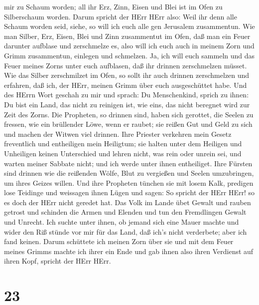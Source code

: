 mir zu Schaum worden; all ihr Erz, Zinn, Eisen und Blei ist im Ofen zu
Silberschaum worden.  Darum spricht der HErr HErr also:
Weil ihr denn alle Schaum worden seid, siehe, so will ich euch alle gen
Jerusalem zusammentun.  Wie man Silber, Erz, Eisen, Blei
und Zinn zusammentut im Ofen, daß man ein Feuer darunter aufblase und
zerschmelze es, also will ich euch auch in meinem Zorn und Grimm
zusammentun, einlegen und schmelzen.  Ja, ich will euch
sammeln und das Feuer meines Zorns unter euch aufblasen, daß ihr drinnen
zerschmelzen müsset.  Wie das Silber zerschmilzet im Ofen,
so sollt ihr auch drinnen zerschmelzen und erfahren, daß ich, der HErr,
meinen Grimm über euch ausgeschüttet habe.  Und des HErrn
Wort geschah zu mir und sprach:  Du Menschenkind, sprich zu
ihnen: Du bist ein Land, das nicht zu reinigen ist, wie eins, das nicht
beregnet wird zur Zeit des Zorns.  Die Propheten, so
drinnen sind, haben sich gerottet, die Seelen zu fressen, wie ein
brüllender Löwe, wenn er raubet; sie reißen Gut und Geld zu sich und
machen der Witwen viel drinnen.  Ihre Priester verkehren
mein Gesetz freventlich und entheiligen mein Heiligtum; sie halten unter
dem Heiligen und Unheiligen keinen Unterschied und lehren nicht, was
rein oder unrein sei, und warten meiner Sabbate nicht; und ich werde
unter ihnen entheiliget.  Ihre Fürsten sind drinnen wie die
reißenden Wölfe, Blut zu vergießen und Seelen umzubringen, um ihres
Geizes willen.  Und ihre Propheten tünchen sie mit losem
Kalk, predigen lose Teidinge und weissagen ihnen Lügen und sagen: So
spricht der HErr HErr! so es doch der HErr nicht geredet hat.
 Das Volk im Lande übet Gewalt und rauben getrost und
schinden die Armen und Elenden und tun den Fremdlingen Gewalt und
Unrecht.  Ich suchte unter ihnen, ob jemand sich eine Mauer
machte und wider den Riß stünde vor mir für das Land, daß ich's nicht
verderbete; aber ich fand keinen.  Darum schüttete ich
meinen Zorn über sie und mit dem Feuer meines Grimms machte ich ihrer
ein Ende und gab ihnen also ihren Verdienst auf ihren Kopf, spricht der
HErr HErr.

\hypertarget{section-22}{%
\section{23}\label{section-22}}

